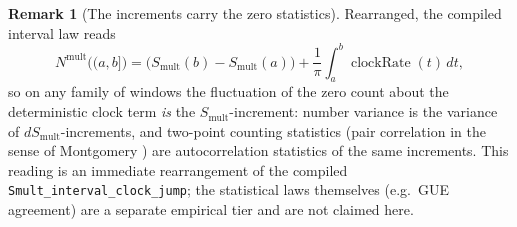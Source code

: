 \documentclass[11pt]{article}
\theoremstyle{definition}
\newtheorem{remark}[theorem]{Remark}
\begin{document}
\begin{remark}[The increments carry the zero statistics]\label{rem:st-statistics}
Rearranged, the compiled interval law reads
\[
N^{\mathrm{mult}}\bigl((a,b]\bigr)
=\bigl(S_{\mathrm{mult}}(b)-S_{\mathrm{mult}}(a)\bigr)
+\frac1\pi\int_a^b\operatorname{clockRate}(t)\,dt,
\]
so on any family of windows the fluctuation of the zero count about the
deterministic clock term \emph{is} the \(S_{\mathrm{mult}}\)-increment:
number variance is the variance of \(dS_{\mathrm{mult}}\)-increments, and
two-point counting statistics (pair correlation in the sense of
Montgomery \cite{Montgomery}) are autocorrelation statistics of the same
increments.  This reading is an immediate rearrangement of the compiled
\texttt{Smult\_interval\_clock\_jump}; the statistical laws themselves
(e.g.\ GUE agreement) are a separate empirical tier and are not claimed
here.
\end{remark}
\end{document}
